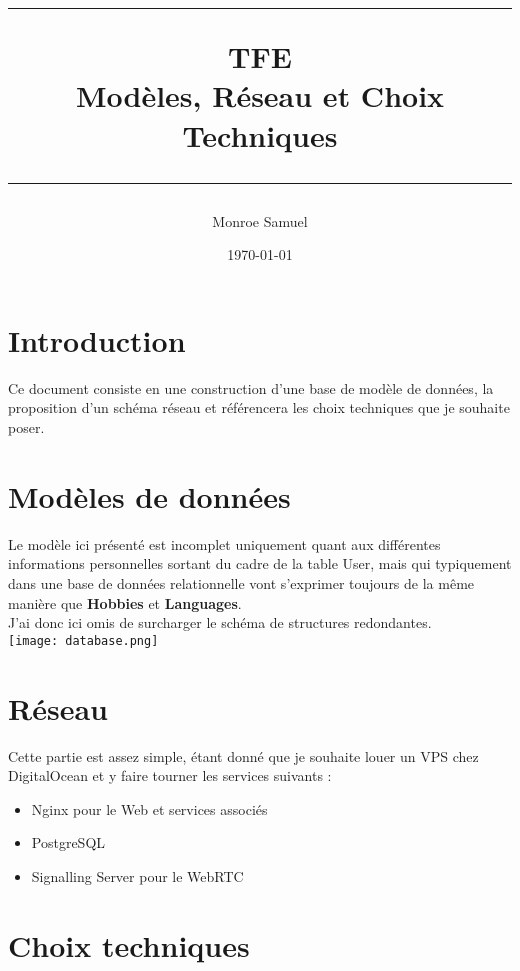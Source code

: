 \documentclass[a4paper,10pt,final,fleqn]{article}
\title{
\parbox{15cm}
{ %
  \vspace{3cm}
	\begin{center}\sf\bfseries\Huge
		\rule{15cm}{1pt}
		\medskip
		TFE \\
		\huge Modèles, Réseau et Choix Techniques
		\vspace{.5cm}
		\rule{15cm}{1pt}
	\end{center}
	\vspace{3cm}
 }}
\author{Monroe Samuel}
\date{\today}
\begin{document}
\maketitle
\newpage

	\section{Introduction}

		Ce document consiste en une construction d'une base de modèle de données, la proposition d'un schéma réseau et référencera les choix techniques que je souhaite poser.\\

	\section{Modèles de données}

		Le modèle ici présenté est incomplet uniquement quant aux différentes informations personnelles sortant du cadre de la table User, mais qui typiquement dans une base de données relationnelle vont s'exprimer toujours de la même manière que \textbf{Hobbies} et \textbf{Languages}.\\
		J'ai donc ici omis de surcharger le schéma de structures redondantes.\\

		\texttt{[image: database.png]}\\

	\section{Réseau}

		Cette partie est assez simple, étant donné que je souhaite louer un VPS chez DigitalOcean et y faire tourner les services suivants : \\

		\begin{itemize}
			\item Nginx pour le Web et services associés
			\item PostgreSQL
			\item Signalling Server pour le WebRTC\\
		\end{itemize}

	\section{Choix techniques}
\end{document}
